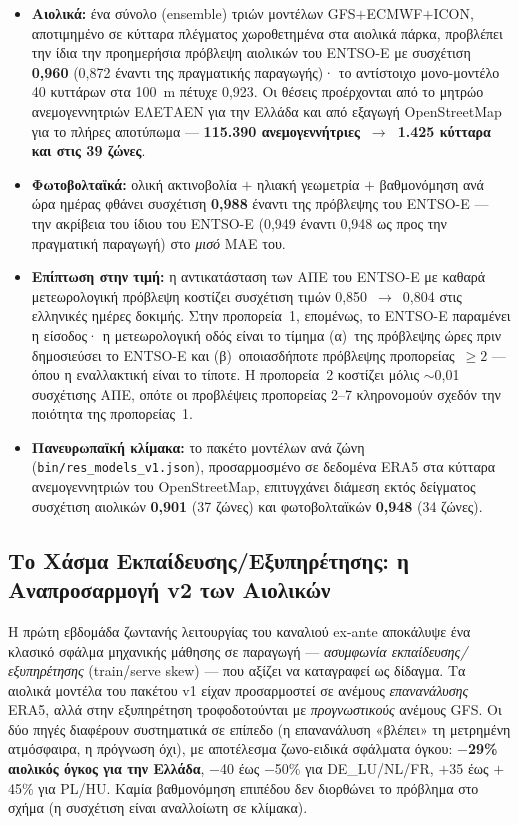 \begin{itemize}
\item \textbf{Αιολικά:} ένα σύνολο (ensemble) τριών μοντέλων GFS$+$ECMWF$+$ICON, αποτιμημένο σε κύτταρα πλέγματος χωροθετημένα στα αιολικά πάρκα, προβλέπει την ίδια την προημερήσια πρόβλεψη αιολικών του ENTSO-E με συσχέτιση \textbf{0,960} (0,872 έναντι της πραγματικής παραγωγής)· το αντίστοιχο μονο-μοντέλο 40 κυττάρων στα 100~m πέτυχε 0,923. Οι θέσεις προέρχονται από το μητρώο ανεμογεννητριών ΕΛΕΤΑΕΝ για την Ελλάδα και από εξαγωγή OpenStreetMap για το πλήρες αποτύπωμα --- \textbf{115.390 ανεμογεννήτριες~$\to$~1.425 κύτταρα και στις 39 ζώνες}.
\item \textbf{Φωτοβολταϊκά:} ολική ακτινοβολία $+$ ηλιακή γεωμετρία $+$ βαθμονόμηση ανά ώρα ημέρας φθάνει συσχέτιση \textbf{0,988} έναντι της πρόβλεψης του ENTSO-E --- την ακρίβεια του ίδιου του ENTSO-E (0,949 έναντι 0,948 ως προς την πραγματική παραγωγή) στο \emph{μισό} MAE του.
\item \textbf{Επίπτωση στην τιμή:} η αντικατάσταση των ΑΠΕ του ENTSO-E με καθαρά μετεωρολογική πρόβλεψη κοστίζει συσχέτιση τιμών 0,850~$\to$~0,804 στις ελληνικές ημέρες δοκιμής. Στην προπορεία~1, επομένως, το ENTSO-E παραμένει η είσοδος· η μετεωρολογική οδός είναι το τίμημα (α)~της πρόβλεψης ώρες πριν δημοσιεύσει το ENTSO-E και (β)~οποιασδήποτε πρόβλεψης προπορείας~$\ge 2$ --- όπου η εναλλακτική είναι το τίποτε. Η προπορεία~2 κοστίζει μόλις $\sim$0,01 συσχέτισης ΑΠΕ, οπότε οι προβλέψεις προπορείας 2--7 κληρονομούν σχεδόν την ποιότητα της προπορείας~1.
\item \textbf{Πανευρωπαϊκή κλίμακα:} το πακέτο μοντέλων ανά ζώνη (\texttt{bin/res\_models\_v1.json}), προσαρμοσμένο σε δεδομένα ERA5 στα κύτταρα ανεμογεννητριών του OpenStreetMap, επιτυγχάνει διάμεση εκτός δείγματος συσχέτιση αιολικών \textbf{0,901} (37 ζώνες) και φωτοβολταϊκών \textbf{0,948} (34 ζώνες).
\end{itemize}

\subsection{Το Χάσμα Εκπαίδευσης/Εξυπηρέτησης: η Αναπροσαρμογή v2 των Αιολικών}
\label{subsec:res-v2-refit}

Η πρώτη εβδομάδα ζωντανής λειτουργίας του καναλιού ex-ante αποκάλυψε ένα κλασικό σφάλμα μηχανικής μάθησης σε παραγωγή --- \emph{ασυμφωνία εκπαίδευσης/εξυπηρέτησης} (train/serve skew) --- που αξίζει να καταγραφεί ως δίδαγμα. Τα αιολικά μοντέλα του πακέτου v1 είχαν προσαρμοστεί σε ανέμους \emph{επανανάλυσης} ERA5, αλλά στην εξυπηρέτηση τροφοδοτούνται με \emph{προγνωστικούς} ανέμους GFS. Οι δύο πηγές διαφέρουν συστηματικά σε επίπεδο (η επανανάλυση «βλέπει» τη μετρημένη ατμόσφαιρα, η πρόγνωση όχι), με αποτέλεσμα ζωνο-ειδικά σφάλματα όγκου: \textbf{$-$29\% αιολικός όγκος για την Ελλάδα}, $-$40 έως $-$50\% για DE\_LU/NL/FR, $+$35 έως $+$45\% για PL/HU. Καμία βαθμονόμηση επιπέδου δεν διορθώνει το πρόβλημα στο σχήμα (η συσχέτιση είναι αναλλοίωτη σε κλίμακα).

